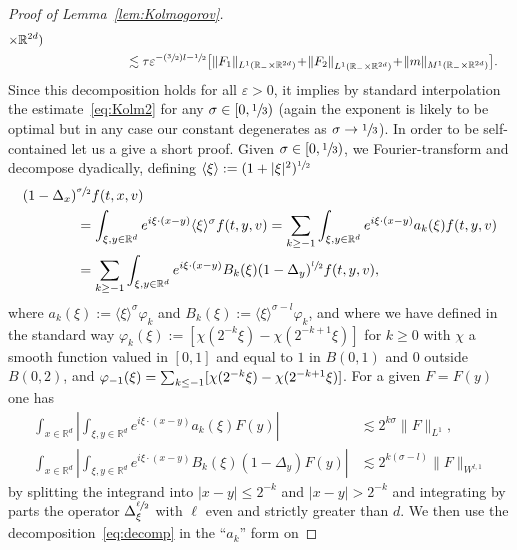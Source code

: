 \documentclass[JEP,XML,SOM,Unicode,NoFloatCountersInSection,published]{cedram}
\newcommand{\Psfrac}[2]{(\sfrac{#1}{#2})}
\theoremstyle{definition}
\theoremstyle{remark}
\newcommand\R{{\mathbb R}}
\let\var\varepsilon
\begin{document}
\begin{proof}[Proof of Lemma~\ref{lem:Kolmogorov}]
\begin{align*}
{\times \R^{2d})} \\
& \hphantom{\| f_\var \|_{L^1(\R_- \times \R^{2d})}} \lesssim
\tau \var^{-\Psfrac32 l -\sfrac12}
\bigl[ \| F_1 \|_{L^1(\R_- \times \R^{2d})} \!+\!
\left\| F_2 \right\|_{L^1(\R_- \times \R^{2d})}
\!+\! \| m \|_{M^1(\R_- \times \R^{2d})} \bigr].
\end{align*}
Since this decomposition holds for all $\var >0$, it implies by
standard interpolation the estimate~\eqref{eq:Kolm2} for any
$\sigma \in [0,\sfrac{1}{3})$ (again the exponent is likely to
be optimal but in any case our constant degenerates as
$\sigma \to \sfrac{1}{3}$). In order to be self-contained let us
a give a short proof. Given $\sigma \in [0,\sfrac13)$, we
Fourier-transform and decompose dyadically, defining
$\langle \xi \rangle:= (1+|\xi|^2)^{\sfrac12}$
\begin{equation}
\label{eq:decomp}
\begin{aligned}
(1-\Delta_x)&^{\sfrac{\sigma}{2}} f(t,x,v) \\
&= \int_{\xi,y \in \R^d} e^{i \xi
\cdot (x-y)} \langle \xi \rangle^\sigma
f(t,y,v)
= \sum_{k \ge -1} \int_{\xi,y \in \R^d} e^{i \xi
\cdot (x-y)} a_k(\xi) f(t,y,v) \\
&= \sum_{k \ge -1} \int_{\xi,y \in \R^d} e^{i \xi
\cdot (x-y)} B_k(\xi) (1-\Delta_y)^{\sfrac{l}{2}} f(t,y,v),
\end{aligned}
\end{equation}
where $a_k(\xi) := \langle \xi \rangle^\sigma \varphi_k$ and
$B_k(\xi) := \langle \xi \rangle^{\sigma-l} \varphi_k$, and
where we have defined in the standard way
$\varphi_k(\xi) := [ \chi(2^{-k}\xi) - \chi(2^{-k+1} \xi) ]$
for $k \ge 0$ with $\chi$ a smooth function valued in $[0,1]$
and equal to $1$ in $B(0,1)$ and $0$ outside $B(0,2)$, and
$\varphi_{-1}(\xi) =\nobreak \sum_{k \le -1} [ \chi(2^{-k}\xi) -\nobreak
\chi(2^{-k+1} \xi) ]$. For a given $F=F(y)$ one has
\begin{align*}
\int_{x \in \R^d} \left| \int_{\xi,y \in \R^d} e^{i \xi
\cdot (x-y)} a_k(\xi) F(y)
\right| &\lesssim 2^{k\sigma} \| F \|_{L^1}, \\
\int_{x \in \R^d} \left| \int_{\xi,y \in \R^d} e^{i \xi
\cdot (x-y)} B_k(\xi) (1-\Delta_y) F(y)
\right| &\lesssim 2^{k(\sigma-l)} \| F \|_{W^{l,1}}
\end{align*}
by splitting the integrand into $|x-y| \le 2^{-k}$ and
$|x-y| > 2^{-k}$ and integrating by parts the operator
$\Delta_\xi^{\sfrac{\ell}{2}}$ with $\ell$ even and strictly
greater than $d$. We then use the
decomposition~\eqref{eq:decomp} in the ``$a_k$'' form on

\end{proof}
\end{document}
